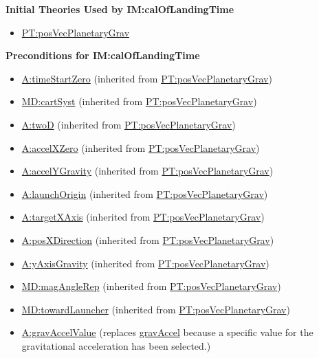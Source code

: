 \documentclass[12pt]{article}
\begin{document}
\noindent \textbf{Initial Theories Used by IM:calOfLandingTime}

\begin{itemize}
\item \hyperref[PT:posVecPlanetaryGrav]{PT:posVecPlanetaryGrav}
\end{itemize}

\noindent \textbf{Preconditions for IM:calOfLandingTime}
\begin{itemize}
\item \hyperref[timeStartZero]{A:timeStartZero} (inherited from \hyperref[PT:posVecPlanetaryGrav]{PT:posVecPlanetaryGrav})
\item \hyperref[MD:cartSyst]{MD:cartSyst} (inherited from \hyperref[PT:posVecPlanetaryGrav]{PT:posVecPlanetaryGrav})
\item \hyperref[twoD]{A:twoD} (inherited from \hyperref[PT:posVecPlanetaryGrav]{PT:posVecPlanetaryGrav})
\item \hyperref[accelXZero]{A:accelXZero} (inherited from \hyperref[PT:posVecPlanetaryGrav]{PT:posVecPlanetaryGrav})
\item \hyperref[accelYGravity]{A:accelYGravity} (inherited from \hyperref[PT:posVecPlanetaryGrav]{PT:posVecPlanetaryGrav})
\item \hyperref[launchOrigin]{A:launchOrigin} (inherited from \hyperref[PT:posVecPlanetaryGrav]{PT:posVecPlanetaryGrav})
\item \hyperref[targetXAxis]{A:targetXAxis} (inherited from \hyperref[PT:posVecPlanetaryGrav]{PT:posVecPlanetaryGrav})
\item \hyperref[posXDirection]{A:posXDirection} (inherited from \hyperref[PT:posVecPlanetaryGrav]{PT:posVecPlanetaryGrav})
\item \hyperref[yAxisGravity]{A:yAxisGravity} (inherited from \hyperref[PT:posVecPlanetaryGrav]{PT:posVecPlanetaryGrav})
\item \hyperref[MD:magAngleRep]{MD:magAngleRep} (inherited from \hyperref[PT:posVecPlanetaryGrav]{PT:posVecPlanetaryGrav})
\item \hyperref[MD:towardLauncher]{MD:towardLauncher} (inherited from \hyperref[PT:posVecPlanetaryGrav]{PT:posVecPlanetaryGrav})

\item \hyperref[gravAccelValue]{A:gravAccelValue} (replaces
\hyperref[gravAccel]{gravAccel} because a specific value for the gravitational
acceleration has been selected.)

\end{itemize}
\end{document}
